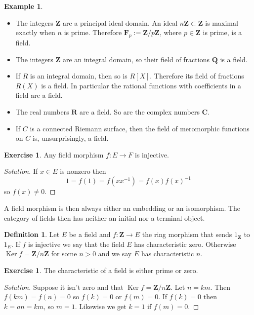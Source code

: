 \documentclass[11pt]{amsart}
\theoremstyle{definition}
\newtheorem{defi}[theo]{Definition}
\newtheorem{exam}[theo]{Example}
\newtheorem{e}[theo]{Exercise}
\newenvironment{s}{\begin{proof}[Solution]}{\end{proof}}
\def\CC{\mathbf{C}}
\def\FF{\mathbf{F}}
\def\RR{\mathbf{R}}
\def\QQ{\mathbf{Q}}
\def\ZZ{\mathbf{Z}}
\DeclareMathOperator{\Ker}{Ker}
\begin{document}
\begin{exam}
\phantom{.}
\begin{itemize}
\item
The integers $\ZZ$ are a principal ideal domain.
An ideal $n\ZZ \subset \ZZ$ is maximal exactly when $n$ is prime.
Therefore $\FF_p := \ZZ / p\ZZ$, where $p \in \ZZ$ is prime, is a field.

\item
The integers $\ZZ$ are an integral domain, so their field of fractions $\QQ$ is a field.

\item
If $R$ is an integral domain, then so is $R[X]$.
Therefore its field of fractions $R(X)$ is a field.
In particular the rational functions with coefficients in a field are a field.

\item
The real numbers $\RR$ are a field.
So are the complex numbers $\CC$.

\item
If $C$ is a connected Riemann surface, then the field of meromorphic functions on $C$ is, unsurprisingly, a field.
\end{itemize}
\end{exam}



\begin{e}
Any field morphism $f : E \to F$ is injective.
\end{e}

\begin{s}
If $x \in E$ is nonzero then
\[
1 
= f(1)
= f(x x^{-1})
= f(x) f(x)^{-1}
\]
so $f(x) \not= 0$.
\end{s}

A field morphism is then always either an embedding or an isomorphism.
The category of fields then has neither an initial nor a terminal object.

\begin{defi}
Let $E$ be a field and $f : \ZZ \to E$ the ring morphism that sends $1_{\ZZ}$ to $1_E$.
If $f$ is injective we say that the field $E$ has characteristic zero.
Otherwise $\Ker f = \ZZ / n \ZZ$ for some $n > 0$ and we say $E$ has characteristic $n$.
\end{defi}


\begin{e}
The characteristic of a field is either prime or zero.
\end{e}

\begin{s}
Suppose it isn't zero and that $\Ker f = \ZZ / n \ZZ$.
Let $n = km$.
Then $f(km) = f(n) = 0$ so $f(k) = 0$ or $f(m) = 0$.
If $f(k) = 0$ then $k = an = km$, so $m = 1$.
Likewise we get $k = 1$ if $f(m) = 0$.
\end{s}
\end{document}
